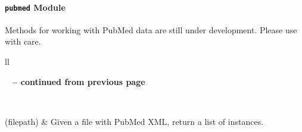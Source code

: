 \documentclass[letterpaper,10pt,english]{sphinxmanual}
\begin{document}
\paragraph{\texttt{pubmed} Module}
\label{tethne.readers:pubmed-module}\label{tethne.readers:module-tethne.readers.pubmed}
Methods for working with PubMed data are still under development. Please use
with care.

\begin{longtable}{ll}
\hline
\endfirsthead

%
{{\bfseries \tablename\ \thetable{} -- continued from previous page}} \\
\hline
\endhead

\hline {} \\ \hline
\endfoot

\hline
\endlastfoot


{\hyperref[tethne.readers:tethne.readers.pubmed.read]{}}(filepath)
 & 
Given a file with PubMed XML, return a list of {\hyperref[tethne:tethne.data.Paper]{}} instances.
\\\hline
\end{longtable}

\end{document}
